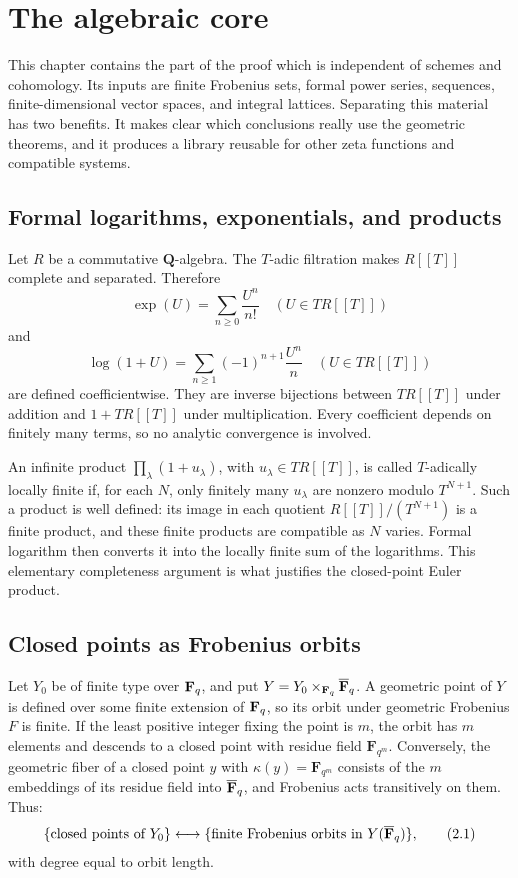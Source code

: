 \chapter{The algebraic core}
\label{chap:algebra-core}

This chapter contains the part of the proof which is independent of
schemes and cohomology.  Its inputs are finite Frobenius sets, formal
power series, sequences, finite-dimensional vector spaces, and integral
lattices.  Separating this material has two benefits.  It makes clear
which conclusions really use the geometric theorems, and it produces a
library reusable for other zeta functions and compatible systems.

\section{Formal logarithms, exponentials, and products}

Let \(R\) be a commutative \(\mathbf Q\)-algebra.  The \(T\)-adic
filtration makes \(R[[T]]\) complete and separated.  Therefore
\[
 \exp(U)=\sum_{n\geq0}\frac{U^n}{n!}
 \quad(U\in TR[[T]])
\]
and
\[
 \log(1+U)=\sum_{n\geq1}(-1)^{n+1}\frac{U^n}{n}
 \quad(U\in TR[[T]])
\]
are defined coefficientwise.  They are inverse bijections between
\(TR[[T]]\) under addition and \(1+TR[[T]]\) under multiplication.
Every coefficient depends on finitely many terms, so no analytic
convergence is involved.

An infinite product \(\prod_{\lambda}(1+u_\lambda)\), with
\(u_\lambda\in TR[[T]]\), is called \(T\)-adically locally finite if, for
each \(N\), only finitely many \(u_\lambda\) are nonzero modulo
\(T^{N+1}\).  Such a product is well defined: its image in each quotient
\(R[[T]]/(T^{N+1})\) is a finite product, and these finite products are
compatible as \(N\) varies.  Formal logarithm then converts it into the
locally finite sum of the logarithms.  This elementary completeness
argument is what justifies the closed-point Euler product.

\section{Closed points as Frobenius orbits}

Let \(Y_0\) be of finite type over \(\mathbf F_q\), and put
\(Y=Y_0\times_{\mathbf F_q}\overline{\mathbf F}_q\).  A geometric point of \(Y\) is defined over
some finite extension of \(\mathbf F_q\), so its orbit under geometric
Frobenius \(F\) is finite.  If the least positive integer fixing the
point is \(m\), the orbit has \(m\) elements and descends to a closed
point with residue field \(\mathbf F_{q^m}\).  Conversely, the geometric
fiber of a closed point \(y\) with
\(\kappa(y)=\mathbf F_{q^m}\) consists of the \(m\) embeddings of its
residue field into \(\overline{\mathbf F}_q\), and Frobenius acts transitively on them.
Thus:
\[
 \{\text{closed points of }Y_0\}
 \longleftrightarrow
 \{\text{finite Frobenius orbits in }Y(\overline{\mathbf F}_q)\},
 \tag{2.1}\label{eq:closed-orbit-bijection}
\]
with degree equal to orbit length.

